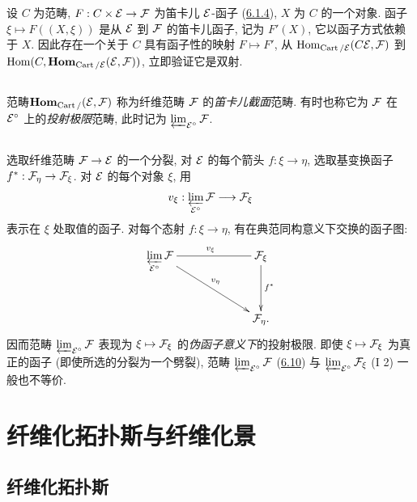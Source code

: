 设 $C$ 为范畴, $F:C\times\Ee\to\Ff$ 为笛卡儿 ${\mathcal E}$-函子
(\hyperref[VI.subsubsec6.1.4]{6.1.4}), $X$ 为 $C$ 的一个对象.
函子 $\xi\mapsto F((X,\xi))$ 是从 ${\mathcal E}$ 到 ${\mathcal F}$ 的笛卡儿函子,
记为 $F'(X)$, 它以函子方式依赖于 $X$.
因此存在一个关于 $C$ 具有函子性的映射 $F\mapsto F'$,
从 $\operatorname{Hom}_{\operatorname{Cart}/{\mathcal E}}(C{\mathcal E},{\mathcal F})$
到 $\operatorname{Hom}(C,\operatorname{\mathbf{Hom}}_{\operatorname{Cart}/{\mathcal E}}({\mathcal E},{\mathcal F}))$,
立即验证它是双射.

\setcounter{subsection}{9}
\subsection{}

范畴\pageoriginale $\operatorname{\mathbf{Hom}}_{\operatorname{Cart}/}({\mathcal E},{\mathcal F})$
称为纤维范畴 ${\mathcal F}$ 的\emph{笛卡儿截面}范畴.
有时也称它为 ${\mathcal F}$ 在 ${\mathcal E}^{\circ}$ 上的\emph{投射极限}范畴,
此时记为 $\varprojlim_{{\mathcal E}^{\circ}}{\mathcal F}$\cite{sga4.exp.VI.bib.2}.

\subsection{}

选取纤维范畴 $\Ff\to\Ee$ 的一个分裂,
\ie 对 ${\mathcal E}$ 的每个箭头 $f:\xi\to\eta$,
选取基变换函子 $f^{\ast}:\Ff_{\eta}\to\Ff_{\xi}$.
对 ${\mathcal E}$ 的每个对象 $\xi$, 用
$$
v_{\xi} : \varprojlim_{\Ee^{\circ}} \Ff \to \Ff_{\xi}
$$
表示在 $\xi$ 处取值的函子.
对每个态射 $f:\xi\to\eta$, 有在典范同构意义下交换的函子图:
\[
\xymatrix@C=2.25cm@R=1.25cm{
\displaystyle\mathop{\varprojlim}_{\Ee^{\circ}} \Ff
\ar@{-}[r]^{v_{\xi}} \ar[rd]^{v_\eta}& \Ff_{\xi} \ar[d]^{f^\ast}\\
                                 & \Ff_\eta.
}
\]
因而范畴 $\varprojlim_{{\mathcal E}^{\circ}}{\mathcal F}$
表现为 $\xi\mapsto{\mathcal F}_{\xi}$ 的\emph{伪函子意义下}的投射极限.
即使 $\xi\mapsto{\mathcal F}_{\xi}$ 为真正的函子
(\ie 即使所选的分裂为一个劈裂\cite{sga4.exp.VI.bib.5}),
范畴 $\varprojlim_{{\mathcal E}^{\circ}}{\mathcal F}$ (\hyperref[VI.subsec6.10]{6.10})
与 $\varprojlim_{{\mathcal E}^{\circ}}{\mathcal F}_{\xi}$ (I 2) 一般也不等价.

\section{纤维化拓扑斯与纤维化景}

\subsection{纤维化拓扑斯}

